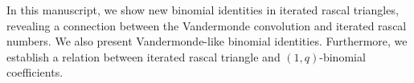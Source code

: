 In this manuscript, we show new binomial identities in iterated rascal triangles,
revealing a connection between the Vandermonde convolution and iterated rascal numbers.
We also present Vandermonde-like binomial identities.
Furthermore, we establish a relation between iterated rascal triangle and $(1,q)$-binomial coefficients.


